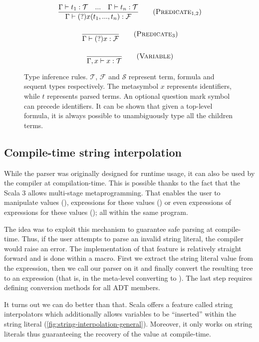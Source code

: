 \begin{figure}[H]
\begin{framed}
\begin{gather}
  \frac{\Gamma \vdash t_1: \mathcal{T} \quad ... \quad \Gamma \vdash t_n: \mathcal{T}}{\Gamma \vdash (?)x(t_1, ..., t_n): \mathcal{F}}
  \tag{$\textsc{Predicate}_{1,2}$} \\[1em]
  \frac{}{\Gamma \vdash (?)x: \mathcal{F}} \tag{$\textsc{Predicate}_3$} \\[1em]
  \frac{}{\Gamma, x \vdash x: \mathcal{T}} \tag{\textsc{Variable}}
  \end{gather}
  \end{framed}
  \caption[Type inference rules]{Type inference rules. $\mathcal{T}$, $\mathcal{F}$ and $\mathcal{S}$ represent term, formula and sequent types respectively. The metasymbol $x$ represents identifiers, while $t$ represents parsed terms. An optional question mark symbol can precede identifiers. It can be shown that given a top-level formula, it is always possible to unambiguously type all the children terms.}
  \label{fig:typing-rules}
\end{figure}

\subsection{Compile-time string interpolation}

While the parser was originally designed for runtime usage, it can also be used by the compiler at compilation-time. This is possible thanks to the fact that the Scala 3 allows multi-stage metaprogramming. That enables the user to manipulate values (), expressions for these values () or even expressions of expressions for these values (); all within the same program.

The idea was to exploit this mechanism to guarantee safe parsing at compile-time. Thus, if the user attempts to parse an invalid string literal, the compiler would raise an error. The implementation of that feature is relatively straight forward and is done within a macro. First we extract the string literal value from the expression, then we call our parser on it and finally convert the resulting tree to an expression (that is, in the meta-level converting  to ). The last step requires defining conversion methods for all ADT members.

It turns out we can do better than that. Scala offers a feature called string interpolators which additionally allows variables to be ``inserted'' within the string literal (\autoref{fig:string-interpolation-general}). Moreover, it only works on string literals thus guaranteeing the recovery of the value at compile-time.

